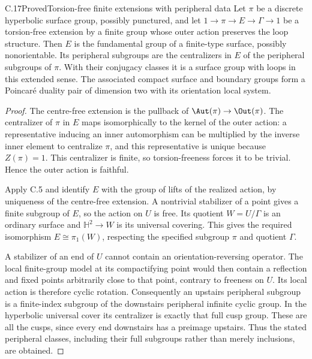 \begin{claim}{C.17}{Proved}{Torsion-free finite extensions with peripheral data}
Let $\pi$ be a discrete hyperbolic surface group, possibly punctured,
and let $1\to\pi\to E\to\Gamma\to1$ be a torsion-free extension by a
finite group whose outer action preserves the loop structure. Then $E$
is the fundamental group of a finite-type surface, possibly
nonorientable. Its peripheral subgroups are the centralizers in $E$ of
the peripheral subgroups of $\pi$. With their conjugacy classes it is a
surface group with loops in this extended sense. The associated compact
surface and boundary groups form a Poincar\'e duality pair of dimension
two with its orientation local system.
\end{claim}
\begin{proof}
The centre-free extension is the pullback of
$\Aut(\pi)\to\Out(\pi)$. The centralizer of $\pi$ in $E$ maps
isomorphically to the kernel of the outer action: a representative
inducing an inner automorphism can be multiplied by the inverse inner
element to centralize $\pi$, and this representative is unique because
$Z(\pi)=1$. This centralizer is finite, so torsion-freeness forces it
to be trivial. Hence the outer action is faithful.

Apply C.5 and identify $E$ with the group of lifts of the realized
action, by uniqueness of the centre-free extension. A nontrivial
stabilizer of a point gives a finite subgroup of $E$, so the action on
$U$ is free. Its quotient $W=U/\Gamma$ is an ordinary surface and
$\mathbb H^2\to W$ is its universal covering. This gives the required
isomorphism $E\cong\pi_1(W)$, respecting the specified subgroup
$\pi$ and quotient $\Gamma$.

A stabilizer of an end of $U$ cannot contain an orientation-reversing
operator. The local finite-group model at its compactifying point would
then contain a reflection and fixed points arbitrarily close to that
point, contrary to freeness on $U$. Its local action is therefore cyclic
rotation. Consequently an upstairs peripheral subgroup is a finite-index
subgroup of the downstairs peripheral infinite cyclic group. In the
hyperbolic universal cover its centralizer is exactly that full cusp
group. These are all the cusps, since every end downstairs has a
preimage upstairs. Thus the stated peripheral classes, including their
full subgroups rather than merely inclusions, are obtained.


\end{proof}
